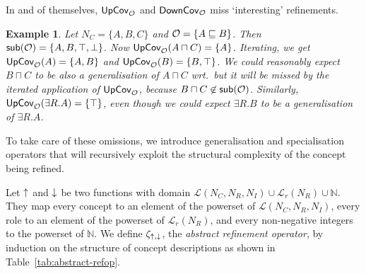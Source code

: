 \documentclass[
]{ceurart}
\newtheorem{example}{Example}
\begin{document}
%
%

\noindent In and of themselves, $\mathsf{UpCov}_{\mathcal{O}}$ and $\mathsf{DownCov}_{\mathcal{O}}$ miss `interesting' refinements. 
%
\begin{example}\label{ex:missing}
Let $N_C = \{A,B,C\}$ and
$\mathcal{O} = \{A \sqsubseteq B\}$. Then $\mathop{\mathsf{sub}}(\mathcal{O}) = \{A, B, \top, \bot\}$. Now $\mathsf{UpCov}_{\mathcal{O}}(A \sqcap C) = \{A\}$. Iterating, we get $\mathsf{UpCov}_{\mathcal{O}}(A) = \{A, B\}$ and $\mathsf{UpCov}_{\mathcal{O}}(B) = \{B, \top\}$. We could reasonably expect $B \sqcap C$ to be also a generalisation of $A \sqcap C$ wrt.\ \Ontology but it will be missed by the iterated application of $\mathsf{UpCov}_{\mathcal{O}}$, because $B \sqcap C \not \in \mathop{\mathsf{sub}}(\mathcal{O})$. Similarly, $\mathsf{UpCov}_{\mathcal{O}}(\exists R. A) = \{\top\}$, even though we could expect $\exists R. B$ to be a generalisation of $\exists R. A$. 
\end{example}
%
To take care of these omissions, we introduce generalisation and specialisation operators that will recursively exploit the structural complexity of the concept being refined.
%

Let $\mathop{\uparrow}$ and $\mathop{\downarrow}$ be two functions with domain $\mathcal{L}(N_C, N_R, N_I) \cup \mathcal{L}_r(N_R) \cup \mathbb{N}$. They map every concept to an element of the powerset of $\mathcal{L}(N_C, N_R, N_I)$, every role to an element of the powerset of $\mathcal{L}_r(N_R)$, and every non-negative integers to the powerset of $\mathbb{N}$. 
%
We define $\zeta_{\mathop{\uparrow},\mathop{\downarrow}}$, the \emph{abstract refinement operator}, by induction on the structure of concept descriptions as shown in Table~\ref{tab:abstract-refop}.
%
\end{document}
